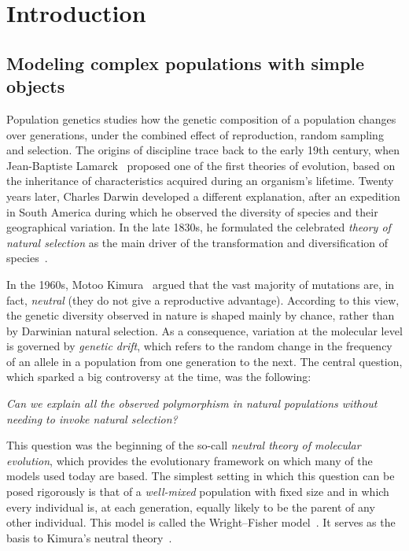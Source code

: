   \chapter{Introduction}\label{chp1_intro}
\section{Modeling complex populations with simple objects}

Population genetics studies how the genetic composition of a population changes
over generations, under the combined effect of reproduction, random sampling and selection. 
The origins of discipline trace back to the early 19th century, when Jean-Baptiste Lamarck~\cite{de_monet_de_lamarck_philosophie_1809} proposed one of the first theories of evolution, based on the inheritance of characteristics acquired during an organism's lifetime. Twenty years later, Charles Darwin developed a different explanation, after an expedition in South America during which he observed the diversity of species and their geographical variation. In the late 1830s, he formulated the celebrated \emph{theory of natural selection} as the main driver of the transformation and diversification of species~\cite{darwin_origin_1859}. 

In the 1960s, Motoo Kimura~\cite{kimura_evolutionary_1968} argued that the vast majority of mutations are, in fact, \emph{neutral} (\ie they do not give a reproductive advantage). According to this view, the genetic diversity observed in nature is shaped mainly by chance, rather than by Darwinian natural selection. As a consequence, variation at the molecular level is governed by \emph{genetic drift}, which refers to the random change in the frequency of an allele in a population from one generation to the next.
The central question, which sparked a big controversy at the time, was the following:

\medskip

\emph{Can we explain all the observed polymorphism in natural populations without needing to invoke natural selection?}

\medskip

This question was the beginning of the so-call \textit{neutral theory of molecular evolution}, which provides the evolutionary framework on which many of the models used today are based.
The simplest setting in which this question can be posed
rigorously is that of a \emph{well-mixed} population with fixed size and in which every individual is, at each generation, equally likely to be the parent of any other individual. This model is called the Wright--Fisher model~\citep{wright_evolution_1931,fisher_genetical_1930}. It serves as the basis to Kimura's neutral theory~\cite{kimura_evolutionary_1968}. 

